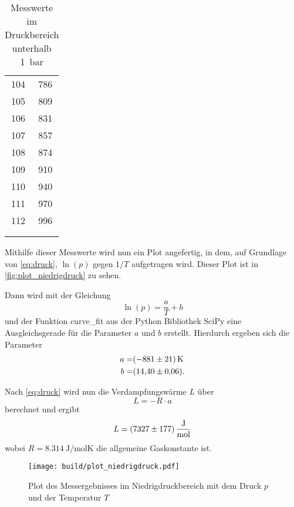 \begin{table}
\begin{tabular}{S[table-format=3.0] S[table-format=3.0]}
        104 & 786 \\
        105 & 809 \\
        106 & 831 \\
        107 & 857 \\
        108 & 874 \\
        109 & 910 \\
        110 & 940 \\
        111 & 970 \\
        112 & 996 \\
        & \\
        & \\
        \bottomrule
    \end{tabular}
    \caption{Messwerte im Druckbereich unterhalb \SI{1}{bar}}
    \label{tab:niedrigdruck_messwerte}
\end{table}

Mithilfe dieser Messwerte wird nun ein Plot angefertig, in dem, auf Grundlage von \autoref{eq:druck}, $\ln(p)$ gegen $1/T$ aufgetragen wird.
Dieser Plot ist in \autoref{fig:plot_niedrigdruck} zu sehen.

Dann wird mit der Gleichung
\begin{equation}
    \ln(p) = \frac{a}{T} + b
\end{equation}
und der Funktion curve\_fit aus der Python Bibliothek SciPy eine Ausgleichsgerade für die Parameter $a$ und $b$ erstellt.\cite{scipy} Hierdurch ergeben sich die Parameter
\begin{align*}
    a =& \SI{-881+-21}{\kelvin} \\
    b =& \SI{14.40+-0.06}{}.
    \label{eq:niedrigdruck_parameter}
\end{align*}

Nach \autoref{eq:druck} wird nun die Verdampfungswärme $L$ über
\begin{equation}
    L = -R \cdot a
\end{equation}
berechnet und ergibt
\begin{equation*}
    L = \SI{7327+-177}{\joule\per\mol}
\end{equation*}
wobei $R=\SI{8.314}{\joule\per\mol\kelvin}$ die allgemeine Gaskonstante ist.\cite{physics_constants}

\begin{figure}
    \centering
    \texttt{[image: build/plot\_niedrigdruck.pdf]}
    \caption{Plot des Messergebnisses im Niedrigdruckbereich mit dem Druck $p$ und der Temperatur $T$}
    \label{fig:plot_niedrigdruck}
\end{figure}


